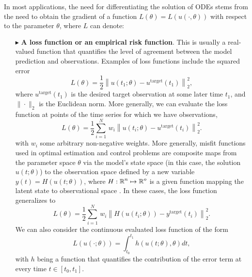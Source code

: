 In most applications, the need for differentiating the solution of ODEs stems from the need to obtain the gradient of a function $L(\theta) = L(u(\cdot, \theta))$ with respect to the parameter $\theta$, where $L$ can denote:
\begin{itemize}
    \item[$ \blacktriangleright$] \textbf{A loss function or an empirical risk function}. This is usually a real-valued function that quantifies the level of agreement between the model prediction and observations. Examples of loss functions include the squared error
    \begin{equation}
         L(\theta) = \frac{1}{2} \left \| u(t_1; \theta) - u^{\text{target}}(t_1) \right \|_2^2,
         \label{eq:quadratic-loss-function}
    \end{equation}
    where $u^{\text{target}}(t_1)$ is the desired target observation at some later time $t_1$, and $\| \cdot \|_2$ is the Euclidean norm.
    More generally, we can evaluate the loss function at points of the time series for which we have observations, 
    \begin{equation}
        L(\theta) 
        = 
        \frac{1}{2} \sum_{i=1}^N 
        \, w_i 
        \left \| u(t_i; \theta) - u^{\text{target}}(t_i) \right \|_2^2.
        \label{eq:quadratic-loss-point}
    \end{equation}
    with $w_i$ some arbitrary non-negative weights.
    More generally, misfit functions used in optimal estimation and control problems are composite maps from the parameter space $\theta$ via the model's state space (in this case, the solution $u(t; \theta)$) to the observation space defined by a new variable $y(t) = H(u(t; \theta))$, where $H: \operatorname{\mathbb{R}}^n \mapsto \operatorname{\mathbb{R}}^o$ is a given function mapping the latent state to observational space \cite{1975-Bryson-Ho-optimal-control}. 
    In these cases, the loss function generalizes to 
    \begin{equation}
        L(\theta) 
        =
        \frac{1}{2} 
        \sum_{i=1}^N
        \, w_i 
        \left \| H(u(t_i; \theta)) - y^{\text{target}}(t_i) \right \|_2^2.
        \label{eq:loss-state-observation}
    \end{equation}
    We can also consider the continuous evaluated loss function of the form
    \begin{equation}
         L(u(\cdot; \theta)) = \int_{t_0}^{t_1} h( u(t;\theta), \theta)  dt, 
         \label{eq:integrated-loss-function}
    \end{equation}
    with $h$ being a function that quantifies the contribution of the error term at every time $t \in [t_0, t_1]$. 

\end{itemize}
